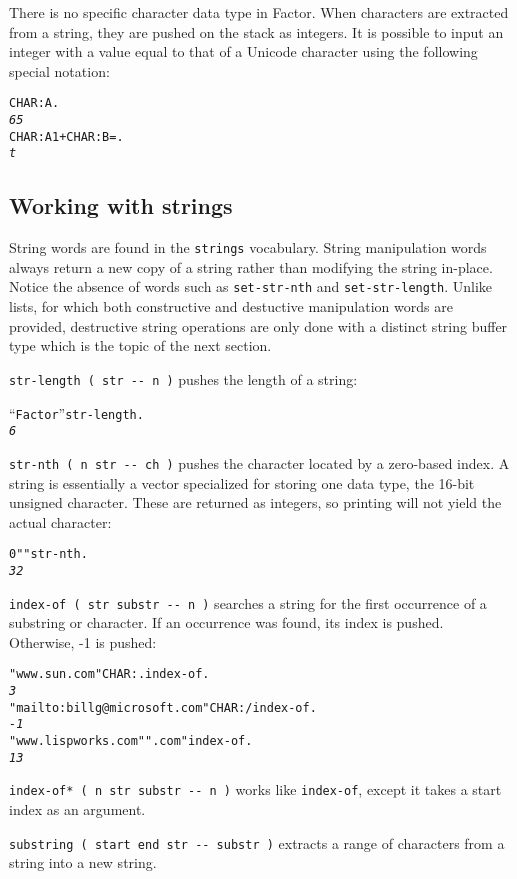 \documentclass[english]{article}
\begin{document}
There is no specific character data type in Factor. When characters
are extracted from a string, they are pushed on the stack as integers.
It is possible to input an integer with a value equal to that of a
Unicode character using the following special notation:

\begin{alltt}
CHAR: A .
\emph{65}
CHAR: A 1 + CHAR: B = .
\emph{t}
\end{alltt}

\subsection{Working with strings}

String words are found in the \texttt{strings} vocabulary. String
manipulation words always return a new copy of a string rather than
modifying the string in-place. Notice the absence of words such as
\texttt{set-str-nth} and \texttt{set-str-length}. Unlike lists, for
which both constructive and destuctive manipulation words are provided,
destructive string operations are only done with a distinct string
buffer type which is the topic of the next section.

\texttt{str-length ( str -{}- n )} pushes the length of a string:

\begin{alltt}
{}``Factor'' str-length .
\emph{6}
\end{alltt}
\texttt{str-nth ( n str -{}- ch )} pushes the character located by
a zero-based index. A string is essentially a vector specialized for
storing one data type, the 16-bit unsigned character. These are returned
as integers, so printing will not yield the actual character:
\begin{alltt}
0 " " str-nth .
\emph{32}
\end{alltt}
\texttt{index-of ( str substr -{}- n )} searches a string for the
first occurrence of a substring or character. If an occurrence was
found, its index is pushed. Otherwise, -1 is pushed:

\begin{alltt}
"www.sun.com" CHAR: . index-of .
\emph{3}
"mailto:billg@microsoft.com" CHAR: / index-of .
\emph{-1}
"www.lispworks.com" ".com" index-of .
\emph{13}
\end{alltt}
\texttt{index-of{*} ( n str substr -{}- n )} works like \texttt{index-of},
except it takes a start index as an argument.

\texttt{substring ( start end str -{}- substr )} extracts a range
of characters from a string into a new string.
\end{document}
